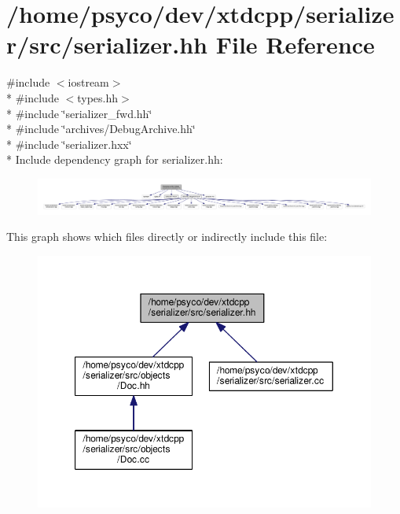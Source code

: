 \hypertarget{serializer_8hh}{}\section{/home/psyco/dev/xtdcpp/serializer/src/serializer.hh File Reference}
\label{serializer_8hh}
{\ttfamily \#include $<$iostream$>$}\\*
{\ttfamily \#include $<$types.\+hh$>$}\\*
{\ttfamily \#include \char`\"{}serializer\+\_\+fwd.\+hh\char`\"{}}\\*
{\ttfamily \#include \char`\"{}archives/\+Debug\+Archive.\+hh\char`\"{}}\\*
{\ttfamily \#include \char`\"{}serializer.\+hxx\char`\"{}}\\*
Include dependency graph for serializer.\+hh\+:
\nopagebreak
\begin{figure}[H]
\begin{center}
\leavevmode
\includegraphics[width=350pt]{serializer_8hh__incl}
\end{center}
\end{figure}
This graph shows which files directly or indirectly include this file\+:
\nopagebreak
\begin{figure}[H]
\begin{center}
\leavevmode
\includegraphics[width=350pt]{serializer_8hh__dep__incl}
\end{center}
\end{figure}
